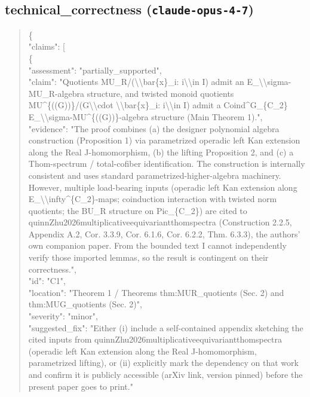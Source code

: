 \documentclass[11pt]{article}
\begin{document}
\subsection*{technical\_correctness (\texttt{claude-opus-4-7})}
\begin{quote}\small\ttfamily\raggedright
\{\\
  "claims": [\\
    \{\\
      "assessment": "partially\_supported",\\
      "claim": "Quotients MU\_R/(\textbackslash{}\textbackslash{}bar\{x\}\_i: i\textbackslash{}\textbackslash{}in I) admit an E\_\textbackslash{}\textbackslash{}sigma-MU\_R-algebra structure, and twisted monoid quotients MU\^{}\{((G))\}/(G\textbackslash{}\textbackslash{}cdot \textbackslash{}\textbackslash{}bar\{x\}\_i: i\textbackslash{}\textbackslash{}in I) admit a Coind\^{}G\_\{C\_2\} E\_\textbackslash{}\textbackslash{}sigma-MU\^{}\{((G))\}-algebra structure (Main Theorem 1).",\\
      "evidence": "The proof combines (a) the designer polynomial algebra construction (Proposition 1) via parametrized operadic left Kan extension along the Real J-homomorphism, (b) the lifting Proposition 2, and (c) a Thom-spectrum / total-cofiber identification. The construction is internally consistent and uses standard parametrized-higher-algebra machinery. However, multiple load-bearing inputs (operadic left Kan extension along E\_\textbackslash{}\textbackslash{}infty\^{}\{C\_2\}-maps; coinduction interaction with twisted norm quotients; the BU\_R structure on Pic\_\{C\_2\}) are cited to quinnZhu2026multiplicativeequivariantthomspectra (Construction 2.2.5, Appendix A.2, Cor. 3.3.9, Cor. 6.1.6, Cor. 6.2.2, Thm. 6.3.3), the authors' own companion paper. From the bounded text I cannot independently verify those imported lemmas, so the result is contingent on their correctness.",\\
      "id": "C1",\\
      "location": "Theorem 1 / Theorems thm:MUR\_quotients (Sec. 2) and thm:MUG\_quotients (Sec. 2)",\\
      "severity": "minor",\\
      "suggested\_fix": "Either (i) include a self-contained appendix sketching the cited inputs from quinnZhu2026multiplicativeequivariantthomspectra (operadic left Kan extension along the Real J-homomorphism, parametrized lifting), or (ii) explicitly mark the dependency on that work and confirm it is publicly accessible (arXiv link, version pinned) before the present paper goes to print."\\

\end{quote}
\end{document}

